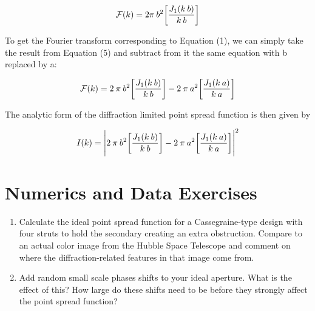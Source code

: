 \begin{answer}
\begin{equation}
\mathcal{F}(k) = 2 \pi \: b^2 \bigg[ \frac{J_1 (k \: b)}{k \: b} \bigg]  \\ \\
\end{equation}

\noindent To get the Fourier transform corresponding to Equation (1), we can simply take the result from Equation (5) and subtract from it the same equation with b replaced by a:

\begin{equation}
\mathcal{F}(k) = 2 \: \pi \: b^2 \bigg[ \frac{J_1 (k \: b)}{k \: b} \bigg] - 2 \: \pi \: a^2 \bigg[ \frac{J_1 (k \: a)}{k \: a} \bigg]  \\ \\
\end{equation}

\noindent The analytic form of the diffraction limited point spread function is then given by 

\begin{equation}
I(k) = \Bigg| 2 \: \pi \: b^2 \bigg[ \frac{J_1 (k \: b)}{k \: b} \bigg] - 2 \: \pi \: a^2 \bigg[ \frac{J_1 (k \: a)}{k \: a} \bigg] \Bigg|^2  \\ \\
\end{equation}
\end{answer}

\section{Numerics and Data Exercises}

\begin{enumerate}
\item Calculate the ideal point spread function for a Cassegraine-type
design with four struts to hold the secondary creating an extra
obstruction. Compare to an actual color image from the Hubble Space
Telescope and comment on where the diffraction-related features in
that image come from.
\item Add random small scale phases shifts to your ideal
aperture. What is the effect of this? How large do these shifts need
to be before they strongly affect the point spread function?
\end{enumerate}


  
